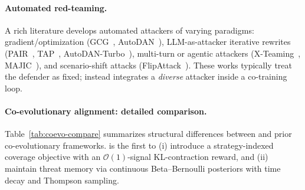 \paragraph{Automated red-teaming.} A rich literature develops automated attackers of varying paradigms: gradient/optimization (GCG~\citep{zou2023universal}, AutoDAN~\citep{liu2023autodan}), LLM-as-attacker iterative rewrites (PAIR~\citep{chao2023pair}, TAP~\citep{mehrotra2024tap}, AutoDAN-Turbo~\citep{liu2024autodan}), multi-turn or agentic attackers (X-Teaming~\citep{rahman2025xteaming}, MAJIC~\citep{qi2025majic}), and scenario-shift attacks (FlipAttack~\citep{liu2024flipattack}). These works typically treat the defender as fixed; \method instead integrates a \emph{diverse} attacker inside a co-training loop.

\paragraph{Co-evolutionary alignment: detailed comparison.} Table~\ref{tab:coevo-compare} summarizes structural differences between \method and prior co-evolutionary frameworks. \method is the first to (i) introduce a strategy-indexed coverage objective with an $\mathcal{O}(1)$-signal KL-contraction reward, and (ii) maintain threat memory via continuous Beta--Bernoulli posteriors with time decay and Thompson sampling.

